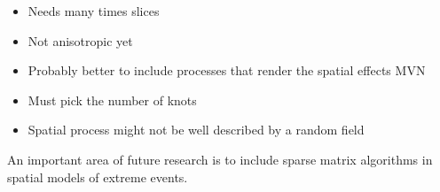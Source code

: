 \documentclass[12pt,english]{article}
\begin{document}
\begin{spacing}{1.3}
\begin{itemize}
  \item Needs many times slices 

  \item Not anisotropic yet

  \item Probably better to include processes that render the spatial effects MVN

  \item Must pick the number of knots 

  \item Spatial process might not be well described by a random field 

\end{itemize}

An important area of future research is to include sparse matrix algorithms in
spatial models of extreme events.




\end{spacing}
\end{document}
